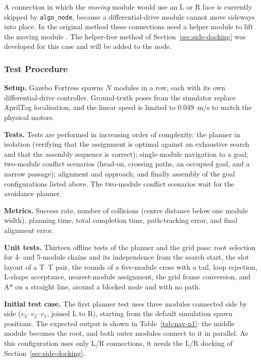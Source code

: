 \documentclass[12pt,a4paper]{article}
\begin{document}
A connection in which the \emph{moving} module would use an L or R face is currently skipped by \texttt{algo\_node}, because a differential-drive module cannot move sideways into place. In the original method these connections need a helper module to lift the moving module \cite{liu2023}. The helper-free method of Section~\ref{sec:side-docking} was developed for this case and will be added to the node.

\subsubsection{Test Procedure}

\textbf{Setup.} Gazebo Fortress spawns $N$ modules in a row, each with its own differential-drive controller. Ground-truth poses from the simulator replace AprilTag localisation, and the linear speed is limited to \SI{0.049}{m/s} to match the physical motors.

\textbf{Tests.} Tests are performed in increasing order of complexity: the planner in isolation (verifying that the assignment is optimal against an exhaustive search and that the assembly sequence is correct); single-module navigation to a goal; two-module conflict scenarios (head-on, crossing paths, an occupied goal, and a narrow passage); alignment and approach; and finally assembly of the goal configurations listed above. The two-module conflict scenarios wait for the avoidance planner.

\textbf{Metrics.} Success rate, number of collisions (centre distance below one module width), planning time, total completion time, path-tracking error, and final alignment error.

\textbf{Unit tests.} Thirteen offline tests of the planner and the grid pass: root selection for 4- and 5-module chains and its independence from the search start, the slot layout of a T--T pair, the rounds of a five-module cross with a tail, loop rejection, L-shape acceptance, nearest-module assignment, the grid frame conversion, and A* on a straight line, around a blocked node and with no path.

\textbf{Initial test case.} The first planner test uses three modules connected side by side ($v_3$--$v_2$--$v_1$, joined L to R), starting from the default simulation spawn positions. The expected output is shown in Table~\ref{tab:nav-n1}: the middle module becomes the root, and both outer modules connect to it in parallel. As this configuration uses only L/R connections, it needs the L/R docking of Section~\ref{sec:side-docking}.
\end{document}
